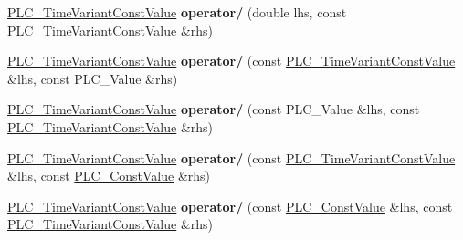 \begin{DoxyCompactItemize}
\item 
\hypertarget{classns3_1_1PLC__TimeVariantConstValue_af87086ed3949a5554f28f50ee37ae680}{\hyperlink{classns3_1_1PLC__TimeVariantConstValue}{\-P\-L\-C\-\_\-\-Time\-Variant\-Const\-Value} {\bfseries operator/} (double lhs, const \hyperlink{classns3_1_1PLC__TimeVariantConstValue}{\-P\-L\-C\-\_\-\-Time\-Variant\-Const\-Value} \&rhs)}\label{classns3_1_1PLC__TimeVariantConstValue_af87086ed3949a5554f28f50ee37ae680}

\item 
\hypertarget{classns3_1_1PLC__TimeVariantConstValue_acc25d4747ff38d47e54d6addc570943b}{\hyperlink{classns3_1_1PLC__TimeVariantConstValue}{\-P\-L\-C\-\_\-\-Time\-Variant\-Const\-Value} {\bfseries operator/} (const \hyperlink{classns3_1_1PLC__TimeVariantConstValue}{\-P\-L\-C\-\_\-\-Time\-Variant\-Const\-Value} \&lhs, const \-P\-L\-C\-\_\-\-Value \&rhs)}\label{classns3_1_1PLC__TimeVariantConstValue_acc25d4747ff38d47e54d6addc570943b}

\item 
\hypertarget{classns3_1_1PLC__TimeVariantConstValue_ac46c54b4554932ecda94d77fdeec121e}{\hyperlink{classns3_1_1PLC__TimeVariantConstValue}{\-P\-L\-C\-\_\-\-Time\-Variant\-Const\-Value} {\bfseries operator/} (const \-P\-L\-C\-\_\-\-Value \&lhs, const \hyperlink{classns3_1_1PLC__TimeVariantConstValue}{\-P\-L\-C\-\_\-\-Time\-Variant\-Const\-Value} \&rhs)}\label{classns3_1_1PLC__TimeVariantConstValue_ac46c54b4554932ecda94d77fdeec121e}

\item 
\hypertarget{classns3_1_1PLC__TimeVariantConstValue_a6e3f0095d4bc9360aefec297a791e3ff}{\hyperlink{classns3_1_1PLC__TimeVariantConstValue}{\-P\-L\-C\-\_\-\-Time\-Variant\-Const\-Value} {\bfseries operator/} (const \hyperlink{classns3_1_1PLC__TimeVariantConstValue}{\-P\-L\-C\-\_\-\-Time\-Variant\-Const\-Value} \&lhs, const \hyperlink{classns3_1_1PLC__ConstValue}{\-P\-L\-C\-\_\-\-Const\-Value} \&rhs)}\label{classns3_1_1PLC__TimeVariantConstValue_a6e3f0095d4bc9360aefec297a791e3ff}

\item 
\hypertarget{classns3_1_1PLC__TimeVariantConstValue_a796c19b079e27ca80c66865f764df093}{\hyperlink{classns3_1_1PLC__TimeVariantConstValue}{\-P\-L\-C\-\_\-\-Time\-Variant\-Const\-Value} {\bfseries operator/} (const \hyperlink{classns3_1_1PLC__ConstValue}{\-P\-L\-C\-\_\-\-Const\-Value} \&lhs, const \hyperlink{classns3_1_1PLC__TimeVariantConstValue}{\-P\-L\-C\-\_\-\-Time\-Variant\-Const\-Value} \&rhs)}\label{classns3_1_1PLC__TimeVariantConstValue_a796c19b079e27ca80c66865f764df093}


\end{DoxyCompactItemize}
